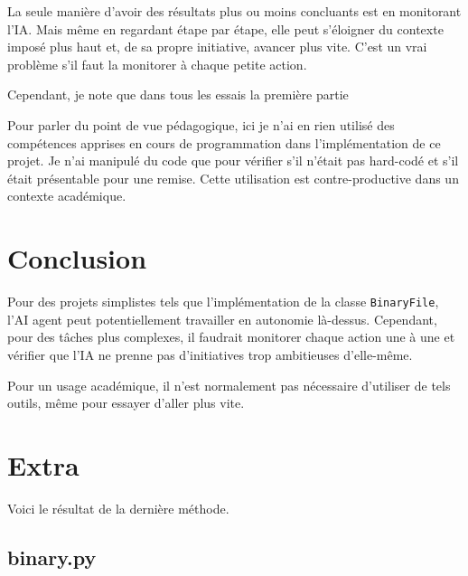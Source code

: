 \documentclass[utf8]{article}
\begin{document}
La seule manière d'avoir des résultats plus ou moins concluants est en monitorant l'IA.
Mais même en regardant étape par étape, elle peut s'éloigner du contexte imposé plus haut et, de sa propre initiative, avancer plus vite. C'est un vrai problème s'il faut la monitorer à chaque petite action.

Cependant, je note que dans tous les essais la première partie

Pour parler du point de vue pédagogique, ici je n'ai en rien utilisé des compétences apprises en cours de programmation dans l'implémentation de ce projet.
Je n'ai manipulé du code que pour vérifier s'il n'était pas hard-codé et s'il était présentable pour une remise.
Cette utilisation est contre-productive dans un contexte académique.

\section{Conclusion}

Pour des projets simplistes tels que l'implémentation de la classe \texttt{BinaryFile}, l'AI agent peut potentiellement travailler en autonomie là-dessus. Cependant, pour des tâches plus complexes, il faudrait monitorer chaque action une à une et vérifier que l'IA ne prenne pas d'initiatives trop ambitieuses d'elle-même.

Pour un usage académique, il n'est normalement pas nécessaire d'utiliser de tels outils, même pour essayer d'aller plus vite.

\section{Extra}

Voici le résultat de la dernière méthode.

\subsection{binary.py}
\end{document}
